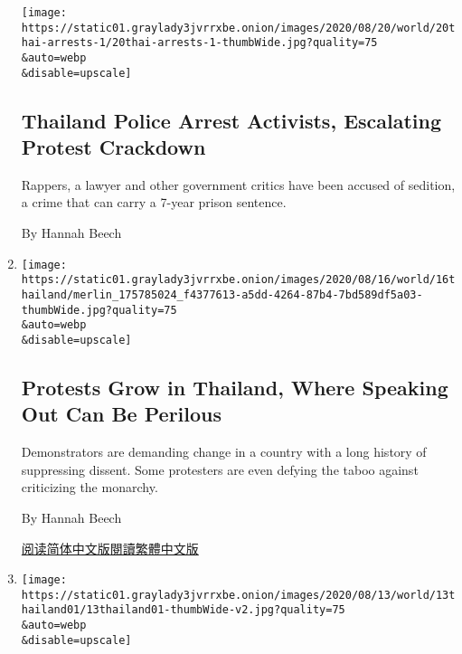 \begin{enumerate}
  \texttt{[image: https://static01.graylady3jvrrxbe.onion/images/2020/08/20/world/20thai-arrests-1/20thai-arrests-1-thumbWide.jpg?quality=75\\\&auto=webp\\\&disable=upscale]}

  \hypertarget{thailand-police-arrest-activists-escalating-protest-crackdown}{%
  \subsection{Thailand Police Arrest Activists, Escalating Protest
  Crackdown}\label{thailand-police-arrest-activists-escalating-protest-crackdown}}

  Rappers, a lawyer and other government critics have been accused of
  sedition, a crime that can carry a 7-year prison sentence.

  By Hannah Beech
\item
  \href{/2020/08/16/world/asia/thailand-protests-democracy-monarchy.html}{}

  \texttt{[image: https://static01.graylady3jvrrxbe.onion/images/2020/08/16/world/16thailand/merlin\_175785024\_f4377613-a5dd-4264-87b4-7bd589df5a03-thumbWide.jpg?quality=75\\\&auto=webp\\\&disable=upscale]}

  \hypertarget{protests-grow-in-thailand-where-speaking-out-can-be-perilous}{%
  \subsection{Protests Grow in Thailand, Where Speaking Out Can Be
  Perilous}\label{protests-grow-in-thailand-where-speaking-out-can-be-perilous}}

  Demonstrators are demanding change in a country with a long history of
  suppressing dissent. Some protesters are even defying the taboo
  against criticizing the monarchy.

  By Hannah Beech

  \href{https://cn.nytimes3xbfgragh.onion/asia-pacific/20200817/thailand-protests-democracy-monarchy/}{阅读简体中文版}\href{https://cn.nytimes3xbfgragh.onion/asia-pacific/20200817/thailand-protests-democracy-monarchy/zh-hant/}{閱讀繁體中文版}
\item
  \href{/2020/08/13/world/asia/protests-thailand-king-monarchy.html}{}

  \texttt{[image: https://static01.graylady3jvrrxbe.onion/images/2020/08/13/world/13thailand01/13thailand01-thumbWide-v2.jpg?quality=75\\\&auto=webp\\\&disable=upscale]}

  \hypertarget{protests-take-on-thai-monarchy-despite-laws-banning-such-criticism}{%
}
\end{enumerate}
